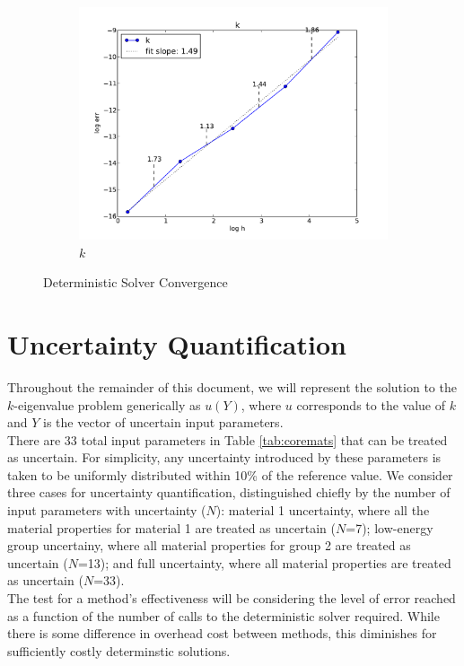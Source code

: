 \documentclass[11pt]{article}
\begin{document}
\begin{figure}[H]
\begin{subfigure}[b]{0.3 \textwidth}
   \includegraphics[width=\textwidth]{k}
   \caption{$k$}
   \label{kconv}
  \end{subfigure}
  \caption{Deterministic Solver Convergence}
  \label{det-conv}
\end{figure}

\section{Uncertainty Quantification}
Throughout the remainder of this document, we will represent the solution to the $k$-eigenvalue problem generically as $u(Y)$, where $u$ corresponds to the value of $k$ and $Y$ is the vector of uncertain input parameters.\\

There are 33 total input parameters in Table \ref{tab:coremats} that can be treated as uncertain.  For simplicity, any uncertainty introduced by these parameters is taken to be uniformly distributed within 10\% of the reference value.  We consider three cases for uncertainty quantification, distinguished chiefly by the number of input parameters with uncertainty ($N$): material 1 uncertainty, where all the material properties for material 1 are treated as uncertain ($N$=7); low-energy group uncertainy, where all material properties for group 2 are treated as uncertain ($N$=13); and full uncertainty, where all material properties are treated as uncertain ($N$=33).\\

The test for a method's effectiveness will be considering the level of error reached as a function of the number of calls to the deterministic solver required.  While there is some difference in overhead cost between methods, this diminishes for sufficiently costly determinstic solutions.
\end{document}
